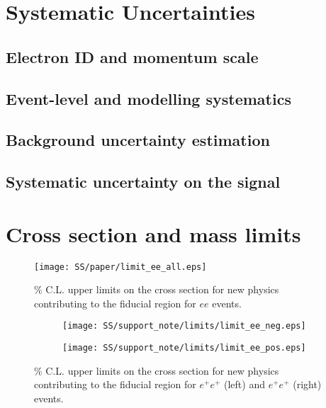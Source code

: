 \section{Systematic Uncertainties}
\label{sec:ss_Systematics}
\subsection{Electron ID and momentum scale}
\subsection{Event-level and modelling systematics}
\subsection{Background uncertainty estimation}
\subsection{Systematic uncertainty on the signal}

\section{Cross section and mass limits}

\begin{figure}[h]
\begin{center}
\texttt{[image: SS/paper/limit\_ee\_all.eps]}
\caption{\% C.L. upper limits on the cross section for new physics contributing to the fiducial region for $ee$ events.}
\label{fig:signal_mass}
\end{center}
\end{figure}


\begin{figure}
\begin{subfigure}{.5\textwidth}
  \centering
  \texttt{[image: SS/support\_note/limits/limit\_ee\_neg.eps]}
\end{subfigure}%
\begin{subfigure}{.5\textwidth}
  \centering
  \texttt{[image: SS/support\_note/limits/limit\_ee\_pos.eps]}
\end{subfigure}
\caption{\% C.L. upper limits on the cross section for new physics contributing to the fiducial region 
for $e^{+}e^{+}$ (left) and $e^{+}e^{+}$ (right) events.}
  \label{fig:signal_kinematics}
\end{figure}

